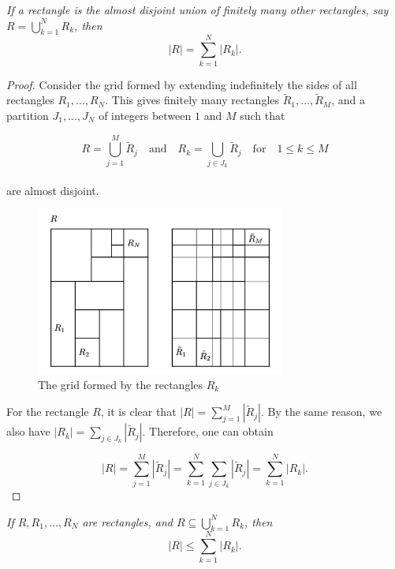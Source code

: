 \documentclass[12pt, a4paper, openany, twoside]{book}
\theoremstyle{definition}
\theoremstyle{remark}
\theoremstyle{plain}
\numberwithin{equation}{section}
\begin{document}
\begin{tcolorbox}[colback=yellow!10!white,colframe=red!75!black,title=Lemma 1.1.1]\label{Lemma 1.1.1}
    \emph{If a rectangle is the almost disjoint union of finitely many other rectangles, say $R=\bigcup_{k=1}^{N}{R_k}$, then}
    \[|R|=\sum_{k=1}^{N}{|R_k|}.\]
\end{tcolorbox}
\begin{proof}
    Consider the grid formed by extending indefinitely the sides of all rectangles $R_1,\dots, R_N$. This gives finitely many rectangles $\tilde{R}_1,\dots,\tilde{R}_M$, and a partition $J_1,\dots, J_N$ of integers between $1$ and $M$ such that

    \[R=\bigcup_{j=1}^{M}{\tilde{R}_j}\quad\text{and}\quad R_k=\bigcup_{j\in J_k}{\tilde{R}_j}\quad\text{for}\quad 1\leq k\leq M\]
    \\
    are almost disjoint.
    \begin{figure}[H]
        \centering
        \includegraphics[height=5.5cm]{Figure 1.1.png}
        \caption{The grid formed by the rectangles $R_k$}
    \end{figure}
    For the rectangle $R$, it is clear that $|R|=\sum_{j=1}^{M}{|\tilde{R}_j|}$. By the same reason, we also have $|R_k|=\sum_{j\in J_k}{|\tilde{R}_j|}$. Therefore, one can obtain

    \[|R|=\sum_{j=1}^{M}{|\tilde{R}_j|}=\sum_{k=1}^{N}{\sum_{j\in J_k}{|\tilde{R}_j|}}=\sum_{k=1}^{N}{|R_k|}.\]
\end{proof}
\vspace{5mm}
\begin{tcolorbox}[colback=yellow!10!white,colframe=red!75!black,title=Lemma 1.1.2]\label{Lemma 1.1.2}
    \emph{If $R, R_1,\dots,R_N$ are rectangles, and $R\subseteq\bigcup_{k=1}^{N}{R_k}$, then}
    \[|R|\leq \sum_{k=1}^{N}{|R_k|}.\]
\end{tcolorbox}
\end{document}
